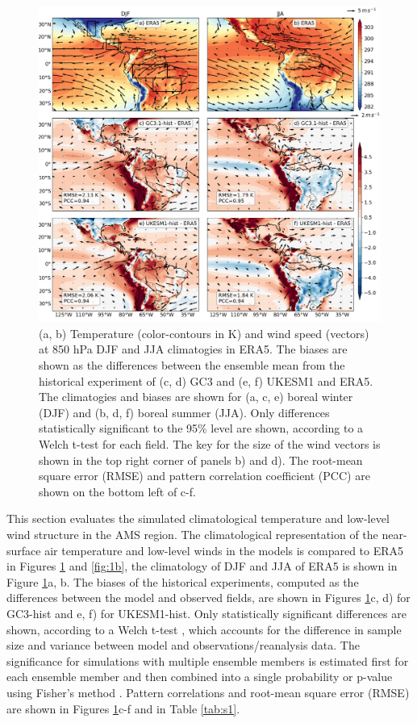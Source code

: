 \begin{figure}[t!]
\centering
 \includegraphics[width=\linewidth]{figures/fig1p2_f1a.png}
\caption[Temperature and SLP climatologies in UKESM1 and HadGEM3]{ (a, b) Temperature (color-contours in K) and wind speed (vectors) at 850 hPa DJF and JJA climatogies in ERA5. The biases are shown as the differences between the ensemble mean from the historical experiment of (c, d) GC3 and  (e, f) UKESM1 and ERA5.
The climatogies and biases are shown for (a, c, e) boreal winter (DJF) and (b, d, f) boreal summer (JJA). Only differences statistically significant to the 95\% level are shown, according to a Welch t-test for each field. The key for the size of the wind vectors is shown in the top right corner of panels b) and d). The root-mean square error (RMSE) and pattern correlation coefficient (PCC) are shown on the bottom left of c-f.}
\label{fig:1}
\end{figure}

This section evaluates the simulated climatological temperature and low-level wind structure in the AMS region.
The climatological representation of the near-surface air temperature and low-level winds in the models is compared to ERA5 in Figures \ref{fig:1} and \ref{fig:1b}, the climatology of DJF and JJA of ERA5 is shown in Figure \ref{fig:1}a, b.
The biases of the historical experiments, computed as the differences between the model and observed fields, are shown in Figures \ref{fig:1}c, d) for GC3-hist and e, f) for UKESM1-hist.
 Only statistically significant differences are shown, according to a Welch t-test \citep{wilks2011}, which accounts for the difference in sample size and variance between model and observations/reanalysis data. The significance for simulations with multiple ensemble members is estimated first for each ensemble member and then combined into a single probability or p-value using Fisher's method \citep{fisher1992statistical}. Pattern correlations and root-mean square error (RMSE) are shown in Figures \ref{fig:1}c-f and in Table \ref{tab:s1}.
 

